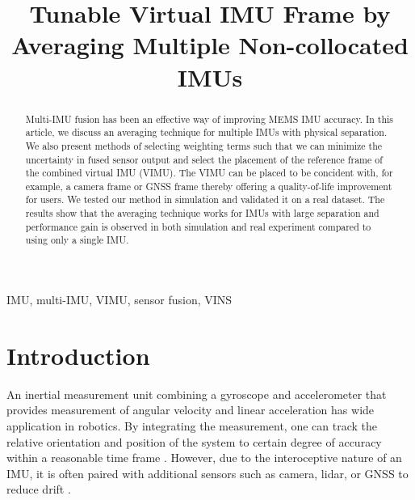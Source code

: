 \documentclass[conference]{IEEEtran}
\begin{document}
\title{Tunable Virtual IMU Frame by Averaging Multiple Non-collocated IMUs}

\author{
\and
{}
}

\maketitle

\begin{abstract}
Multi-IMU fusion has been an effective way of improving MEMS IMU accuracy. In this article, we discuss an averaging technique for multiple IMUs with physical separation. We also present methods of selecting weighting terms such that we can minimize the uncertainty in fused sensor output and select the placement of the reference frame of the combined virtual IMU (VIMU). The VIMU can be placed to be concident with, for example, a camera frame or GNSS frame thereby offering a quality-of-life improvement for users. We tested our method in simulation and validated it on a real dataset. The results show that the averaging technique works for IMUs with large separation and performance gain is observed in both simulation and real experiment compared to using only a single IMU.
\end{abstract}

\begin{IEEEkeywords}
IMU, multi-IMU, VIMU, sensor fusion, VINS
\end{IEEEkeywords}

\section{Introduction}

An inertial measurement unit combining a gyroscope and accelerometer that provides measurement of angular velocity and linear acceleration has wide application in robotics. By integrating the measurement, one can track the relative orientation and position of the system to certain degree of accuracy within a reasonable time frame \cite{tang2022_preintegration}. However, due to the interoceptive nature of an IMU, it is often paired with additional sensors such as camera, lidar, or GNSS to reduce drift \cite{alaba2024_gps_and_imu, shan2020_liosam, he2020_visual_imu_and_gps}.
\end{document}
